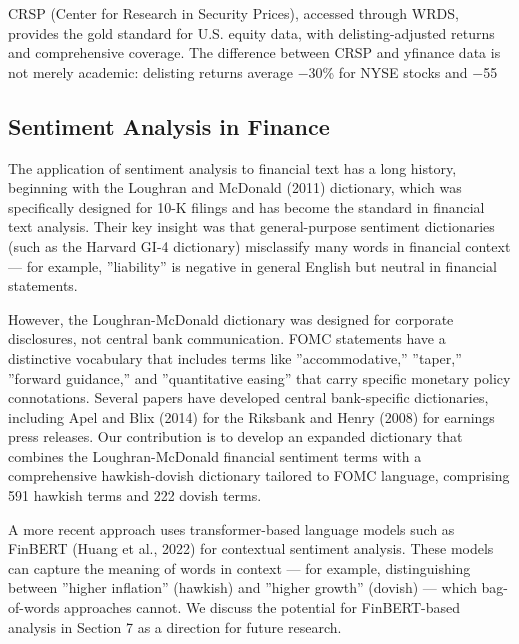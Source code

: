 \documentclass[12pt]{article}
\begin{document}
CRSP (Center for Research in Security Prices), accessed through WRDS, provides the gold standard for U.S. equity data, with delisting-adjusted returns and comprehensive coverage. The difference between CRSP and yfinance data is not merely academic: delisting returns average $-$30\% for NYSE stocks and $-$55%

\subsection{Sentiment Analysis in Finance}

The application of sentiment analysis to financial text has a long history, beginning with the Loughran and McDonald (2011) dictionary, which was specifically designed for 10-K filings and has become the standard in financial text analysis. Their key insight was that general-purpose sentiment dictionaries (such as the Harvard GI-4 dictionary) misclassify many words in financial context --- for example, ''liability'' is negative in general English but neutral in financial statements.

However, the Loughran-McDonald dictionary was designed for corporate disclosures, not central bank communication. FOMC statements have a distinctive vocabulary that includes terms like ''accommodative,'' ''taper,'' ''forward guidance,'' and ''quantitative easing'' that carry specific monetary policy connotations. Several papers have developed central bank-specific dictionaries, including Apel and Blix (2014) for the Riksbank and Henry (2008) for earnings press releases. Our contribution is to develop an expanded dictionary that combines the Loughran-McDonald financial sentiment terms with a comprehensive hawkish-dovish dictionary tailored to FOMC language, comprising 591 hawkish terms and 222 dovish terms.

A more recent approach uses transformer-based language models such as FinBERT (Huang et al., 2022) for contextual sentiment analysis. These models can capture the meaning of words in context --- for example, distinguishing between ''higher inflation'' (hawkish) and ''higher growth'' (dovish) --- which bag-of-words approaches cannot. We discuss the potential for FinBERT-based analysis in Section 7 as a direction for future research.
\end{document}
